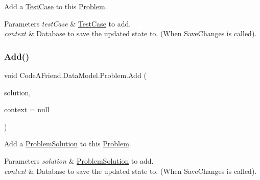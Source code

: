 Add a \mbox{\hyperlink{class_code_a_friend_1_1_data_model_1_1_test_case}{Test\+Case}} to this \mbox{\hyperlink{class_code_a_friend_1_1_data_model_1_1_problem}{Problem}}. 


\begin{DoxyParams}{Parameters}
{\em test\+Case} & \mbox{\hyperlink{class_code_a_friend_1_1_data_model_1_1_test_case}{Test\+Case}} to add.\\
\hline
{\em context} & Database to save the updated state to. (When Save\+Changes is called).\\
\hline
\end{DoxyParams}
\mbox{\label{class_code_a_friend_1_1_data_model_1_1_problem_a72e426e2924615d8fc813de8303bc16b}} 
\subsubsection{\texorpdfstring{Add()}{Add()}\hspace{0.1cm}{\footnotesize\ttfamily [2/3]}}
{\footnotesize\ttfamily void Code\+A\+Friend.\+Data\+Model.\+Problem.\+Add (\begin{DoxyParamCaption}\item[{\mbox{\hyperlink{class_code_a_friend_1_1_data_model_1_1_problem_solution}{Problem\+Solution}}}]{solution,  }\item[{Db\+Context}]{context = {\ttfamily null} }\end{DoxyParamCaption})}



Add a \mbox{\hyperlink{class_code_a_friend_1_1_data_model_1_1_problem_solution}{Problem\+Solution}} to this \mbox{\hyperlink{class_code_a_friend_1_1_data_model_1_1_problem}{Problem}}. 


\begin{DoxyParams}{Parameters}
{\em solution} & \mbox{\hyperlink{class_code_a_friend_1_1_data_model_1_1_problem_solution}{Problem\+Solution}} to add.\\
\hline
{\em context} & Database to save the updated state to. (When Save\+Changes is called).\\
\hline
\end{DoxyParams}
\mbox{\label{class_code_a_friend_1_1_data_model_1_1_problem_ab8ba911fa018638164edf5fe6d0076ec}} 
